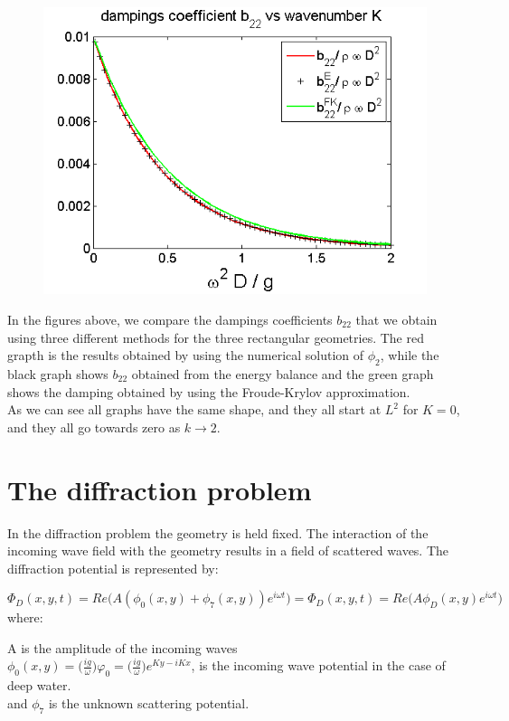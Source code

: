 \documentclass[a4paper,10pt]{article}
\begin{document}
\begin{figure}[H]
  \caption{}\label{add_mass_box2_2}
\endminipage
{}%
  \includegraphics[width=\linewidth]{ad_mass_box3_2.png}
  \caption{}\label{add_mass_box3_2}
\endminipage
\end{figure}

In the figures above, we compare the dampings coefficients $b_{22}$ that we obtain using three different methods for the three rectangular geometries. The red grapth is the results obtained by using the numerical solution of $\phi_2$, while the black graph shows $b_{22}$ obtained from the energy balance and the green graph shows the damping obtained by using the Froude-Krylov approximation.\\
As we can see all graphs have the same shape, and they all start at $L^2$ for $K=0$, and they all go towards zero as $k \rightarrow 2$.


\section{The diffraction problem}
In the diffraction problem the geometry is held fixed. The interaction of the incoming wave field with the geometry results in a field of scattered waves. The diffraction potential is represented by:

\begin{equation}
\Phi_D(x,y,t) = Re \Big( A (\phi_0(x,y) + \phi_7(x,y) ) e^{i \omega t} \Big) = \Phi_D(x,y,t) = Re \Big( A \phi_D(x,y) e^{i \omega t} \Big) 
\end{equation}
where: 

A is the amplitude of the incoming waves\\
$\phi_0(x,y) = \big(\frac{ig}{\omega}\big) \varphi_0 = \big(\frac{ig}{\omega}\big) e^{K y - iKx}$, is the incoming wave potential in the case of deep water.\\
and $\phi_7$ is the unknown scattering potential.\\[1 em]
\end{document}
